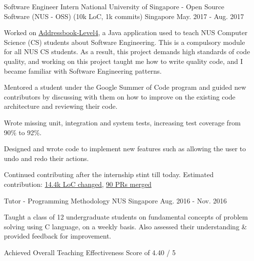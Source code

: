 \begin{cventries}
  \cventry
    {Software Engineer Intern} %
    {National University of Singapore - Open Source Software (NUS - OSS) (10k LoC, 1k commits)} %
    {Singapore} %
    {May. 2017 - Aug. 2017} %
    {
      \begin{cvitems} %
        \item {Worked on \href{https://github.com/issues?utf8=\%E2\%9C\%93&q=repo\%3Ase-edu\%2Faddressbook-level4+involves\%3AZhiyuan-Amos}{Addressbook-Level4}, a Java application used to teach NUS Computer Science (CS) students about Software Engineering. This is a compulsory module for all NUS CS students. As a result, this project demands high standards of code quality, and working on this project taught me how to write quality code, and I became familiar with Software Engineering patterns.}
        \item {Mentored a student under the Google Summer of Code program and guided new contributors by discussing with them on how to improve on the existing code architecture and reviewing their code.}
        \item {Wrote missing unit, integration and system tests, increasing test coverage from 90\% to 92\%.}
        \item {Designed and wrote code to implement new features such as allowing the user to undo and redo their actions.}
        \item {Continued contributing after the internship stint till today. Estimated contribution: \href{https://github.com/se-edu/addressbook-level4/graphs/contributors}{14.4k LoC changed}, \href{https://github.com/se-edu/addressbook-level4/pulls?utf8=\%E2\%9C\%93&q=is\%3Apr+is\%3Aclosed+author\%3AZhiyuan-Amos+is\%3Amerged}{90 PRs merged}}
      \end{cvitems}
    }
 

  \cventry
    {Tutor - Programming Methodology} %
    {NUS} %
    {Singapore} %
    {Aug. 2016 - Nov. 2016} %
    {
      \begin{cvitems} %
        \item {Taught a class of 12 undergraduate students on fundamental concepts of problem solving using C language, on a weekly basis. Also assessed their understanding \& provided feedback for improvement.}
        \item {Achieved Overall Teaching Effectiveness Score of 4.40 / 5}
      \end{cvitems}
    }

\end{cventries}
